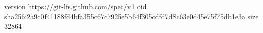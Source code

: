 version https://git-lfs.github.com/spec/v1
oid sha256:2a9c0f41188fd4bfa355c67c7925e5b64f305cdfd7d8c63e0d45e75f75db1e3a
size 32864
